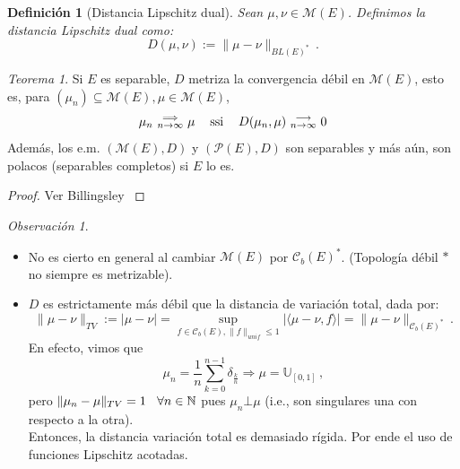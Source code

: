 \documentclass[letterpaper,11pt]{article} %
\def\espacio{\hspace{.25cm}\,}
\theoremstyle{defbreak}
\newtheorem{definition}{Definición}[subsection]
\theoremstyle{propbreak}
\theoremstyle{remark}
\newtheorem{remark}{Observación}[subsection]
\theoremstyle{break}
\newtheorem{theorem}{Teorema}[subsection]
\def\beforeitemize{\leavevmode \vspace{-0.5\baselineskip}}
\def\gris{\color{mygray}}
\def\negro{\color{black}}
\begin{document}
\begin{definition}[Distancia Lipschitz dual]
Sean $\mu,\nu\in\mathcal{M}(E)$. Definimos la distancia Lipschitz dual como: $$D(\mu,\nu):=\|\mu-\nu\|_{BL(E)^*} \, .$$
\end{definition}

\begin{theorem}
Si $E$ es separable, $D$ metriza la convergencia débil en $\mathcal{M}(E)$, esto es, para  $(\mu_n)\subseteq\mathcal{M}(E),\mu\in\mathcal{M}(E)$,
$$ \mu_n \mbox{ }\substack{\Longrightarrow \\n \to \infty}\mbox{ } \mu \espacio \mbox{ ssi } \espacio D(\mu_n,\mu)\mbox{ }\substack{\longrightarrow \\ n\to\infty}\mbox{ }0$$
Además, los e.m. $(\mathcal{M}(E),D)$ y $(\mathcal{P}(E),D)$ son separables y más aún, son polacos (separables completos) si $E$ lo es.
\end{theorem}
\begin{proof}
\gris Ver Billingsley \cite{billing} \negro
\end{proof}

\begin{remark}
\beforeitemize
\begin{itemize}
\item No es cierto en general al cambiar $\mathcal{M}(E)$ por $\mathcal{C}_b(E)^*$. (Topología débil $*$ no siempre es metrizable).
\item $D$ es estrictamente más débil que la distancia de variación total, dada por: 
$$\|\mu-\nu\|_{TV}:=|\mu-\nu|= \displaystyle\sup_{f\in \mathcal{C}_b(E),\|f\|_{unif}\leq 1}|\langle \mu-\nu,f\rangle|=\|\mu-\nu\|_{\mathcal{C}_b(E)^*} \, . $$
En efecto,  vimos que
$$ \mu_n=\frac{1}{n}\displaystyle\sum^{n-1}_{k=0}\delta_{\frac{k}{n}}\Longrightarrow\mu=\mathbb{U}_{[0,1]} \, , $$
pero $\|\mu_n-\mu\|_{TV}=1\espacio\forall n\in\mathbb{N}$ pues $\mu_n\bot\mu$ (i.e., son singulares una con respecto a la otra). 
\\ Entonces, la distancia variación total es demasiado rígida. Por ende el uso de funciones Lipschitz acotadas.
\end{itemize}
\end{remark}

\vspace{3cm}
\end{document}

